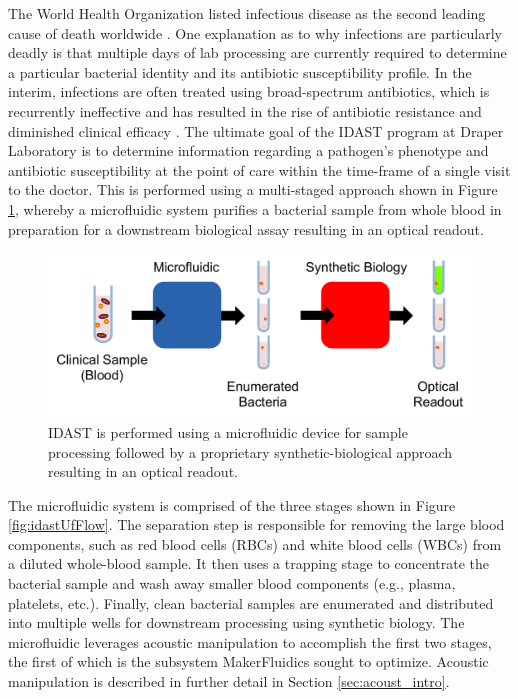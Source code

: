 The World Health Organization listed infectious disease as the second leading cause of death worldwide \cite{world2004world}. One explanation as to why infections are particularly deadly is that multiple days of lab processing are currently required to determine a particular bacterial identity and its antibiotic susceptibility profile. In the interim, infections are often treated using broad-spectrum antibiotics, which is recurrently ineffective and has resulted in the rise of antibiotic resistance and diminished clinical efficacy \cite{laxminarayan2013antibiotic}. The ultimate goal of the IDAST program at Draper Laboratory is to determine information regarding a pathogen's phenotype and antibiotic susceptibility at the point of care within the time-frame of a single visit to the doctor. This is performed using a multi-staged approach shown in Figure \ref{fig:idastFlow}, whereby a microfluidic system purifies a bacterial sample from whole blood in preparation for a downstream biological assay resulting in an optical readout.

\begin{figure}[h]
  \begin{minipage}[t]{0.99\linewidth}\centering
    \includegraphics[width=13cm]{idastFlow.pdf}
    \medskip
  \end{minipage}\hfill
  \caption[System-level view of IDAST]{IDAST is performed using a microfluidic device for sample processing followed by a proprietary synthetic-biological approach resulting in an optical readout.}
    \label{fig:idastFlow}
\end{figure}

The microfluidic system is comprised of the three stages shown in Figure \ref{fig:idastUfFlow}. The separation step is responsible for removing the large blood components, such as red blood cells (RBCs) and white blood cells (WBCs) from a diluted whole-blood sample. It then uses a trapping stage to concentrate the bacterial sample and wash away smaller blood components (e.g., plasma, platelets, etc.). Finally, clean bacterial samples are enumerated and distributed into multiple wells for downstream processing using synthetic biology. The microfluidic leverages acoustic manipulation to accomplish the first two stages, the first of which is the subsystem MakerFluidics sought to optimize. Acoustic manipulation is described in further detail in Section \ref{sec:acoust_intro}.

